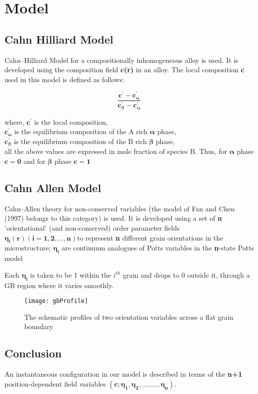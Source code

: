 \chapter{Model}

\section{Cahn Hilliard Model}
Cahn–Hilliard Model for a compositionally inhomogeneous alloy is used. It is developed using the composition field \textbf{c(r)} in an alloy. The local composition \textbf{c} used in this model is defined as follows: 

\begin{equation}
\mathbold{
\frac{c^{'}-c^{'}_{\alpha}}{c^{'}_{\beta}-c^{'}_{\alpha}}
}
\end{equation}

where, $\mathbold{c^{'}}$ is the local composition,\\
$\mathbold{c^{'}_{\alpha}}$ is the equilibrium composition of the A rich $\mathbold{\alpha}$ phase,\\
$\mathbold{c^{'}_{\beta}}$ is the equilibrium composition of the B rich $\mathbold{\beta}$ phase,\\
all the above values are expressed in mole fraction of species B. Thus, for $\mathbold{\alpha}$ phase $\mathbold{c = 0}$ and for $\mathbold{\beta}$ phase $\mathbold{c = 1}$


\section{Cahn Allen Model}
Cahn–Allen theory for non-conserved variables (the model of Fan and Chen (1997) belongs to this category) is used. It is developed using a set of \textbf{n} 'orientational' (and non-conserved) order parameter fields $\mathbold{\eta_{i}(r) (i =1,2,...,n) }$to represent \textbf{n} different grain orientations in the microstructure; $\mathbold{\eta_{i}}$ are continuum analogues of Potts variables in the \textbf{n}-state Potts model

Each $\mathbold{\eta_{i}}$ is taken to be 1 within the $i^{th}$ grain and drops
to 0 outside it, through a GB region where it varies smoothly.

\begin{figure}[H]
\texttt{[image: gbProfile]}
\caption{The schematic profiles of two orientation variables across a flat grain boundary}
\end{figure}

\section{Conclusion}
An instantaneous configuration in our model is described in terms of the \textbf{n+1} position-dependent field variables $\mathbold{(c;\eta_1, \eta_2, …….., \eta_n)}$.

